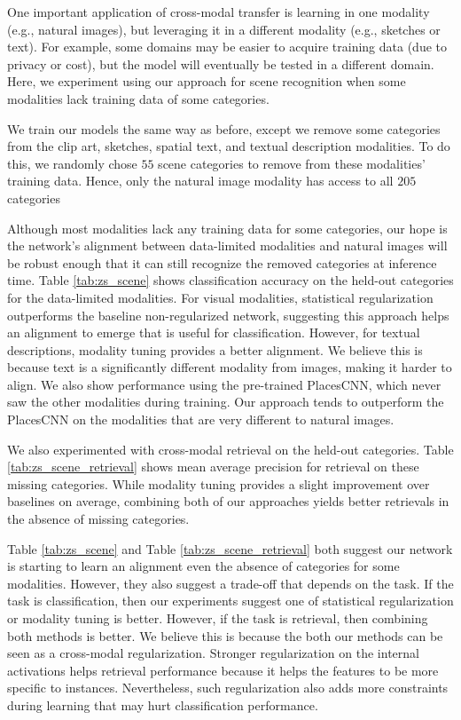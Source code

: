 \documentclass[10pt,journal,compsoc]{IEEEtran}
\begin{document}
    One important application of cross-modal transfer is learning
    in one modality (e.g., natural images), but leveraging it in a different modality (e.g., sketches or text). For example, some domains may be easier to acquire training data (due to privacy or cost), but the model will eventually be tested in a different domain. Here, we experiment using our approach for scene recognition when some modalities lack training data of some categories. 
    
    We train our models the same way as before, except we remove some categories from the clip art, sketches, spatial text, and textual description modalities. To do this, we randomly chose $55$ scene categories to remove from these modalities' training data. Hence, only the natural image modality has access to all $205$ categories
    
    Although most modalities lack any training data for some categories, our hope is the network's alignment between data-limited modalities and natural images will be robust enough that it can still recognize the removed categories at inference time. Table \ref{tab:zs_scene} shows classification accuracy on the held-out categories for the data-limited modalities. For visual modalities, statistical regularization outperforms the baseline non-regularized network, suggesting this approach helps an alignment to emerge that is useful for classification. However, for textual descriptions, modality tuning provides a better alignment. We believe this is because text is a significantly different modality from images, making it harder to align. We also show performance using the pre-trained PlacesCNN, which never saw the other modalities during training. Our approach tends to outperform the PlacesCNN on the modalities that are very different to natural images.
    
    We also experimented with cross-modal retrieval on the held-out categories. Table \ref{tab:zs_scene_retrieval} shows mean average precision for retrieval on these missing categories. While modality tuning provides a slight improvement over baselines on average, combining both of our approaches yields better retrievals in the absence of missing categories. 
    
    Table \ref{tab:zs_scene} and Table \ref{tab:zs_scene_retrieval} both suggest our network is starting to learn an alignment even the absence of categories for some modalities. However, they also suggest a  trade-off that depends on the task. If the task is classification, then our experiments suggest one of statistical regularization or modality tuning is better. However, if the task is retrieval, then combining both methods is better. We believe this is because the both our methods can be seen as a cross-modal regularization. Stronger regularization on the internal activations helps retrieval performance because it helps the features to be more specific to instances. Nevertheless, such regularization also adds more constraints during learning that may hurt classification performance.
\end{document}
